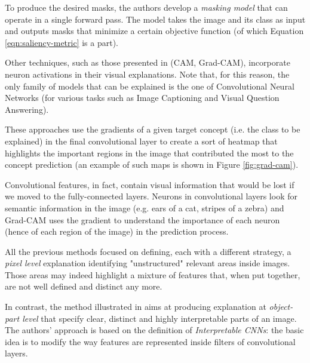 \documentclass[12pt, twoside, a4paper]{report}
\begin{document}
To produce the desired masks, the authors develop a \textit{masking model} that can operate in a single forward pass. The model takes the image and its class as input and outputs masks that minimize a certain objective function (of which Equation \ref{eqn:saliency-metric} is a part).\bigskip

Other techniques, such as those presented in \cite{zhou, gradcam} (CAM, Grad-CAM), incorporate neuron activations in their visual explanations. Note that, for this reason, the only family of models that can be explained is the one of Convolutional Neural Networks (for various tasks such as Image Captioning and Visual Question Answering).

These approaches use the gradients of a given target concept (i.e. the class to be explained) in the final convolutional layer to create a sort of heatmap that highlights the important regions in the image that contributed the most to the concept prediction (an example of such maps is shown in Figure \ref{fig:grad-cam}).

Convolutional features, in fact, contain visual information that would be lost if we moved to the fully-connected layers. Neurons in convolutional layers look for semantic information in the image (e.g. ears of a cat, stripes of a zebra) and Grad-CAM uses the gradient to understand the importance of each neuron (hence of each region of the image) in the prediction process.\bigskip



All the previous methods focused on defining, each with a different strategy, a \textit{pixel level} explanation identifying "unstructured" relevant areas inside images. Those areas may indeed highlight a mixture of features that, when put together, are not well defined and distinct any more. 

In contrast, the method illustrated in \cite{interpretable-convnets} aims at producing explanation at \textit{object-part level} that specify clear, distinct and highly interpretable parts of an image. The authors' approach is based on the definition of \textit{Interpretable CNNs}: the basic idea is to modify the way features are represented inside filters of convolutional layers. 
\end{document}
